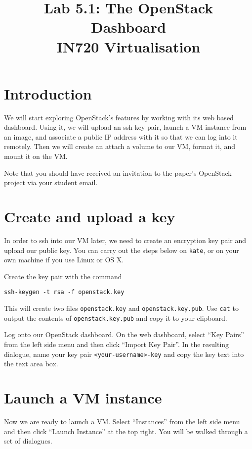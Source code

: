 \documentclass{article}
\begin{document}
\title{Lab 5.1: The OpenStack Dashboard \\ IN720 Virtualisation}
\date{}
\maketitle

\section*{Introduction}
We will start exploring OpenStack's features by working with its web based dashboard. Using it, we will upload an ssh key pair, launch a VM instance from an image, and associate a public IP address with it so that we can log into it remotely. Then we will create an attach a volume to our VM, format it, and mount it on the VM.

Note that you should have received an invitation to the paper's OpenStack project via your student email.



\section{Create and upload a key}
In order to ssh into our VM later, we need to create an encryption key pair and upload our public key. You can carry out the steps below on \texttt{kate}, or on your own machine if you use Linux or OS X.

Create the key pair with the command

\begin{verbatim}
ssh-keygen -t rsa -f openstack.key
\end{verbatim}

This will create two files \texttt{openstack.key} and \texttt{openstack.key.pub}. Use \texttt{cat} to output the contents of \texttt{openstack.key.pub} and copy it to your clipboard.

Log onto our OpenStack dashboard. On the web dashboard, select ``Key Pairs'' from the left side menu and then click ``Import Key Pair''. In the resulting dialogue, name your key pair \texttt{<your-username>-key} and copy the key text into the text area box.

\section{Launch a VM instance}
Now we are ready to launch a VM. Select ``Instances'' from the left side menu and then click ``Launch Instance'' at the top right. You will be walked through a set of dialogues.
\end{document}
